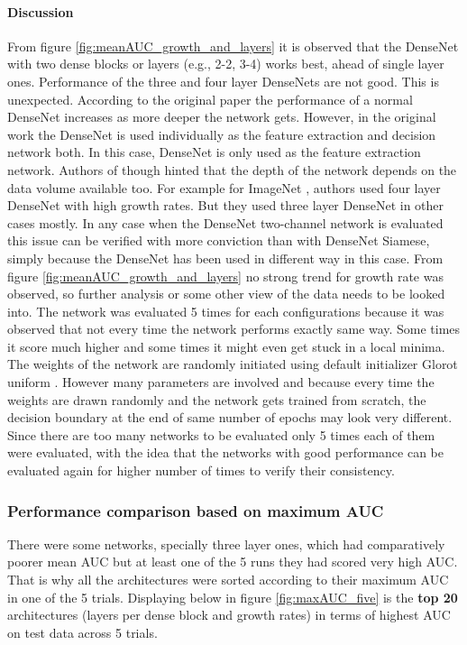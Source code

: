 \paragraph{Discussion\\}
From figure \ref{fig:meanAUC_growth_and_layers} it is observed that the DenseNet with two dense blocks or layers (e.g., 2-2, 3-4)  works best, ahead of single layer ones. Performance of the three and four layer DenseNets are not 
good. This is unexpected. According to the original paper \cite{densenet} the performance of a normal DenseNet increases as more deeper the network gets. However, in the original work the DenseNet is used individually as the 
feature extraction and decision network both. In this case, DenseNet is only used as the feature extraction network. Authors of \cite{densenet} though hinted that the depth of the network depends on the data volume available too.
For example for ImageNet \cite{imagenet}, authors used four layer DenseNet with high growth rates. But they used three layer DenseNet in other cases mostly. In any case when the DenseNet two-channel network is evaluated this issue can be 
verified with more conviction than with DenseNet Siamese, simply because the DenseNet has been used in different way in this case. From figure \ref{fig:meanAUC_growth_and_layers} no strong trend for growth rate was observed, so 
further analysis or some other view of the data needs to be looked into. 
The network was evaluated 5 times for each configurations because it was observed that not every time the network performs exactly same way. Some times
it score much higher and some times it might even get stuck in a local minima. The weights of the network are randomly initiated using default initializer Glorot uniform \cite{kerasinit}. However many parameters are involved 
and because every time the weights are drawn randomly and the network gets trained from scratch, the decision boundary at the end of same number of epochs may look very different. Since there are too many networks to be evaluated
only 5 times each of them were evaluated, with the idea that the networks with good performance can be evaluated again for higher number of times to verify their consistency. 

\subsubsection{Performance comparison based on maximum AUC}

There were some networks, specially three layer ones, which had comparatively poorer mean AUC but at least one of the 5 runs they had scored very high AUC. That is why all the architectures were sorted according to their maximum AUC in one
of the 5 trials. Displaying below in figure \ref{fig:maxAUC_five} is the \textbf{top 20} architectures (layers per dense block and growth rates) in terms of highest AUC on test data across 5 trials.

